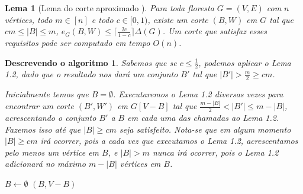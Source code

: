 \documentclass[a4paper,12pt]{article}
\newtheorem{lem}{Lema}
\newtheorem{alg}{Descrevendo o algoritmo}
\begin{document}
\bigskip
\bigskip
\bigskip
\bigskip

\begin{lem}[Lema do corte aproximado \cite{Schmidt15, Lemma 3}]

	Para toda floresta $G=(V,E)$ com $n$ vértices, todo $m \in [n]$
	e todo $c \in [0,1)$,
	existe um corte $(B,W)$ em $G$ tal que 
	$cm \le |B| \le m$,
	$e_G(B,W) \le \lceil \frac{2c}{1-c}\rceil \Delta(G)$.
	Um corte que satisfaz esses requisitos pode ser computado em
	tempo $O(n)$.
\end{lem}

\medskip

\begin{alg}
	
	Sabemos que se $c \le \frac{1}{2}$, podemos aplicar o Lema 1.2, 
	dado que o resultado nos dará um conjunto $B'$ tal que
	$|B'|>\frac{m}{2}\ge cm$.

	Inicialmente temos que $B = \emptyset$.
	Executaremos o Lema 1.2 diversas vezes para encontrar 
	um corte $(B',W')$ em $G[V-B]$ tal que $\frac{m-|B|}{2}<|B'|\le m-|B|$,
	acrescentando o conjunto $B'$ a $B$ em cada uma das chamadas ao Lema 1.2.
	Fazemos isso até que $|B|\ge cm$ seja satisfeito.
	Nota-se que em algum momento $|B|\ge cm$ irá ocorrer, pois a cada vez
	que executamos o Lema 1.2, acrescentamos pelo menos um vértice em $B$,
	e $|B|>m$ nunca irá ocorrer, pois o Lema 1.2 adicionará no máximo 
	$m-|B|$ vértices em $B$.

\end{alg}

\begin{algorithm}[H]

	\caption{Computa corte aproximado}
	$B \gets \emptyset$\;
	{
	}
	\Return $(B,V-B)$

\end{algorithm}	

\newpage


\end{document}
